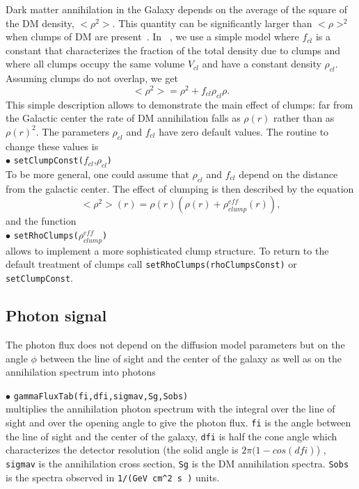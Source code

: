 \documentclass[12pt,a4paper]{article}
\begin{document}
Dark matter annihilation in the Galaxy depends on the average of the square of the DM density, $<\rho^2>$. This quantity 
can be significantly larger than $<\rho>^2$ when clumps of DM are present~\cite{Lavalle:2006vb}.  
In \micro~,   we use  a simple model where $f_{cl}$ is a constant 
that characterizes the fraction of the total density due to clumps
 and  where all clumps occupy  the
same volume $V_{cl}$ and have a constant density $\rho_{cl}$. Assuming  clumps do not  overlap, we get 
\begin{equation} 
    <\rho^2> = \rho^2 +  f_{cl}\rho_{cl}\rho .
\end{equation}
This simple description allows to  demonstrate  the main effect of clumps:  far from the Galactic center the rate of DM annihilation falls as $\rho(r)$ rather than as
$\rho(r)^2$. The parameters $\rho_{cl}$  and  $f_{cl}$ have zero default values.  
The routine to change these values is \\
 \noindent $\bullet$ \verb|setClumpConst(|$f_{cl}$,$\rho_{cl}$\verb|)| \\
To be more general, one could assume that $\rho_{cl}$  and  $f_{cl}$  depend on the distance from the galactic center. The effect of clumping  is then described  by the equation 
\begin{equation}
<\rho^2>(r)=\rho(r)(\rho(r) +  \rho_{clump}^{eff}(r)),
\end{equation}
and the function \\
\noindent $\bullet$ \verb|setRhoClumps(|$\rho_{clump}^{eff}$\verb|)|\\
allows to implement a more sophisticated clump  structure. To return to the default  treatment of clumps call
\verb|setRhoClumps(rhoClumpsConst)| or \verb|setClumpConst|.


\subsection{Photon  signal}
The photon  flux does not depend on the  diffusion model parameters but on the angle
$\phi$ between the line of sight and the center of the galaxy as well as on the annihilation spectrum
into photons

\noindent
$\bullet$ \verb|gammaFluxTab(fi,dfi,sigmav,Sg,Sobs)|\\
multiplies the annihilation photon spectrum  with the integral over the line of sight
and over the opening angle to give the photon flux. 
\verb|fi| is the angle between the line of sight and the center of the
galaxy,   \verb|dfi| is half the cone angle which characterizes the detector resolution
(the solid angle is  $2\pi (1-cos(dfi)$) ,  
 \verb|sigmav| is the annihilation cross section, \verb|Sg| is the DM annihilation spectra.
\verb|Sobs| is the spectra observed in \verb|1/(GeV cm^2 s )| units. 
\end{document}
